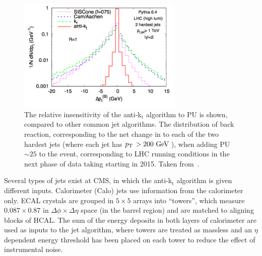 \begin{figure}[htbp]
  \begin{center}
  \includegraphics[width=0.7\textwidth]{Figures/detector/PUantiKT}
  \caption{The relative insensitivity of the anti-k$_{\mathrm{t}}$ algorithm to \ac{PU} is shown, compared to other common jet algorithms. The distribution of back reaction, corresponding to the net change in \pt to each of the two hardest jets (where each jet has $p_{\text{T}}\,>200~\mathrm{GeV}\,$), when adding \ac{PU}$\sim 25$ to the event, corresponding to \ac{LHC} running conditions in the next phase of data taking starting in 2015. Taken from~\cite{bib:akjets}.}
  \label{fig:antikT_PU}
  \end{center}
\end{figure}

Several types of jets exist at \ac{CMS}, in which the anti-k$_{\mathrm{t}}$ algorithm is given different inputs.
Calorimeter (Calo) jets use information from the calorimeter only.
\ac{ECAL} crystals are grouped in $5\times5$ arrays into ``towers'', which measure $0.087\times0.87$ in $\Delta\phi \times \Delta \eta$ space (in the barrel region) and are matched to aligning blocks of \ac{HCAL}.
The sum of the energy deposits in both layers of calorimeter are used as inputs to the jet algorithm, where towers are treated as massless and an $\eta$ dependent energy threshold has been placed on each tower to reduce the effect of instrumental noise. 

